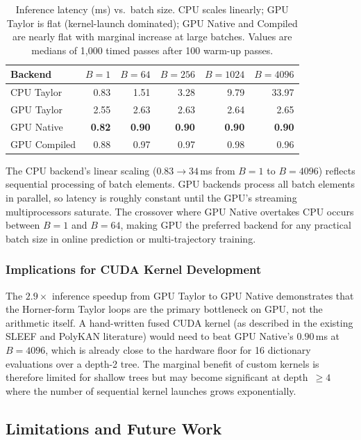 \documentclass[11pt]{article}
\begin{document}
\begin{table}[t]
\centering
\caption{Inference latency (ms) vs.\ batch size.  CPU scales linearly;
  GPU Taylor is flat (kernel-launch dominated); GPU Native and Compiled
  are nearly flat with marginal increase at large batches.  Values are
  medians of 1{,}000 timed passes after 100 warm-up passes.}
\label{tab:batch-scaling}
\begin{tabular}{lrrrrr}
\toprule
Backend & $B\!=\!1$ & $B\!=\!64$ & $B\!=\!256$ & $B\!=\!1024$ & $B\!=\!4096$ \\
\midrule
CPU Taylor      & 0.83 & 1.51 & 3.28 &  9.79 & 33.97 \\
GPU Taylor      & 2.55 & 2.63 & 2.63 &  2.64 &  2.65 \\
GPU Native      & \textbf{0.82} & \textbf{0.90} & \textbf{0.90} & \textbf{0.90} & \textbf{0.90} \\
GPU Compiled    & 0.88 & 0.97 & 0.97 &  0.98 &  0.96 \\
\bottomrule
\end{tabular}
\end{table}

\noindent
The CPU backend's linear scaling ($0.83 \to 34$\,ms from $B\!=\!1$ to
$B\!=\!4096$) reflects sequential processing of batch elements.  GPU
backends process all batch elements in parallel, so latency is roughly
constant until the GPU's streaming multiprocessors saturate.  The
crossover where GPU Native overtakes CPU occurs between $B\!=\!1$ and
$B\!=\!64$, making GPU the preferred backend for any practical batch
size in online prediction or multi-trajectory training.

\subsubsection{Implications for CUDA Kernel Development}

The $2.9\times$ inference speedup from GPU Taylor to GPU Native
demonstrates that the Horner-form Taylor loops are the primary bottleneck
on GPU, not the arithmetic itself.  A hand-written fused CUDA kernel
(as described in the existing SLEEF and PolyKAN literature) would need
to beat GPU Native's $0.90$\,ms at $B\!=\!4096$, which is already
close to the hardware floor for 16 dictionary evaluations over a
depth-2 tree.  The marginal benefit of custom kernels is therefore
limited for shallow trees but may become significant at depth~$\ge 4$
where the number of sequential kernel launches grows exponentially.


\subsection{Limitations and Future Work}
\label{sec:limitations}
\end{document}

